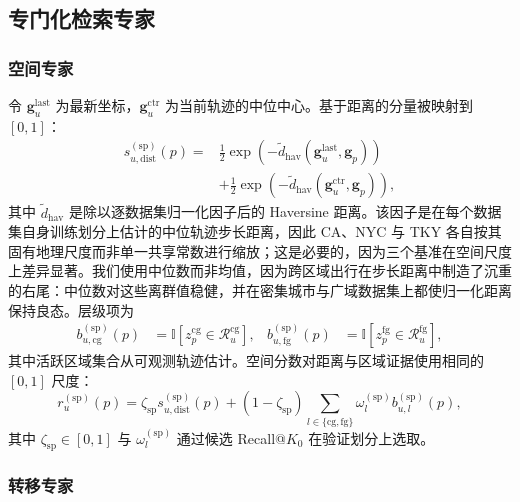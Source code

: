 \documentclass[10pt,fontset=none,twocolumn]{ctexart}
\newcommand{\Ind}{\mathbb{I}}
\begin{document}
\subsection{专门化检索专家}
\label{subsec:experts}

\subsubsection{空间专家}

令 $\bm{g}_{u}^{\mathrm{last}}$ 为最新坐标，$\bm{g}_{u}^{\mathrm{ctr}}$ 为当前轨迹的中位中心。基于距离的分量被映射到 $[0,1]$：
\begin{equation}
\begin{aligned}
s_{u,\mathrm{dist}}^{(\mathrm{sp})}(p)
={}&\frac{1}{2}\exp\!\left(-\widetilde d_{\mathrm{hav}}
(\bm{g}_{u}^{\mathrm{last}},\bm{g}_{p})\right)\\
&+\frac{1}{2}\exp\!\left(-\widetilde d_{\mathrm{hav}}
(\bm{g}_{u}^{\mathrm{ctr}},\bm{g}_{p})\right),
\end{aligned}
\label{eq:spatial_exact}
\end{equation}
其中 $\widetilde d_{\mathrm{hav}}$ 是除以逐数据集归一化因子后的 Haversine 距离。该因子是在每个数据集自身训练划分上估计的中位轨迹步长距离，因此 CA、NYC 与 TKY 各自按其固有地理尺度而非单一共享常数进行缩放；这是必要的，因为三个基准在空间尺度上差异显著。我们使用中位数而非均值，因为跨区域出行在步长距离中制造了沉重的右尾：中位数对这些离群值稳健，并在密集城市与广域数据集上都使归一化距离保持良态。层级项为
\begin{align}
b_{u,\mathrm{cg}}^{(\mathrm{sp})}(p)
&=
\Ind[z_p^{\mathrm{cg}}\in\mathcal{R}_{u}^{\mathrm{cg}}],
&
b_{u,\mathrm{fg}}^{(\mathrm{sp})}(p)
&=
\Ind[z_p^{\mathrm{fg}}\in\mathcal{R}_{u}^{\mathrm{fg}}],
\label{eq:spatial_backoff}
\end{align}
其中活跃区域集合从可观测轨迹估计。空间分数对距离与区域证据使用相同的 $[0,1]$ 尺度：
\begin{equation}
r_u^{(\mathrm{sp})}(p)
=
\zeta_{\mathrm{sp}}s_{u,\mathrm{dist}}^{(\mathrm{sp})}(p)
+
(1-\zeta_{\mathrm{sp}})
\sum_{l\in\{\mathrm{cg},\mathrm{fg}\}}
\omega_l^{(\mathrm{sp})}b_{u,l}^{(\mathrm{sp})}(p),
\label{eq:spatial_fusion}
\end{equation}
其中 $\zeta_{\mathrm{sp}}\in[0,1]$ 与 $\omega_l^{(\mathrm{sp})}$ 通过候选 Recall@$K_0$ 在验证划分上选取。

\subsubsection{转移专家}
\end{document}
